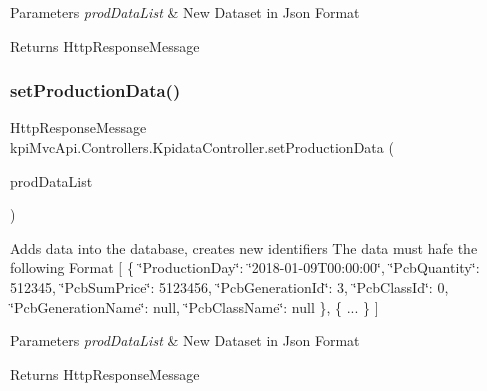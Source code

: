 \begin{DoxyParams}{Parameters}
{\em prod\+Data\+List} & New Dataset in Json Format \\
\hline
\end{DoxyParams}
\begin{DoxyReturn}{Returns}
{\ttfamily Http\+Response\+Message} 
\end{DoxyReturn}
\mbox{\label{classkpi_mvc_api_1_1_controllers_1_1_kpidata_controller_a7f6c6c359f37a9b9a83d481b5c26a037}} 
\subsubsection{\texorpdfstring{set\+Production\+Data()}{setProductionData()}\hspace{0.1cm}{\footnotesize\ttfamily [2/2]}}
{\footnotesize\ttfamily Http\+Response\+Message kpi\+Mvc\+Api.\+Controllers.\+Kpidata\+Controller.\+set\+Production\+Data (\begin{DoxyParamCaption}\item[{List$<$ \hyperlink{classkpi_mvc_api_1_1_data_transfer_objects_1_1_production_data_dto}{Production\+Data\+Dto} $>$}]{prod\+Data\+List }\end{DoxyParamCaption})\hspace{0.3cm}{\ttfamily [inline]}}



Adds data into the database, creates new identifiers The data must hafe the following Format \mbox{[} \{ \char`\"{}\+Production\+Day\char`\"{}\+: \char`\"{}2018-\/01-\/09\+T00\+:00\+:00\char`\"{}, \char`\"{}\+Pcb\+Quantity\char`\"{}\+: 512345, \char`\"{}\+Pcb\+Sum\+Price\char`\"{}\+: 5123456, \char`\"{}\+Pcb\+Generation\+Id\char`\"{}\+: 3, \char`\"{}\+Pcb\+Class\+Id\char`\"{}\+: 0, \char`\"{}\+Pcb\+Generation\+Name\char`\"{}\+: null, \char`\"{}\+Pcb\+Class\+Name\char`\"{}\+: null \}, \{ ... \} \mbox{]} 


\begin{DoxyParams}{Parameters}
{\em prod\+Data\+List} & New Dataset in Json Format \\
\hline
\end{DoxyParams}
\begin{DoxyReturn}{Returns}
{\ttfamily Http\+Response\+Message} 
\end{DoxyReturn}
\mbox{\label{classkpi_mvc_api_1_1_controllers_1_1_kpidata_controller_a893e7ff73b6dbd31afa5e1aa73e5abae}} 
